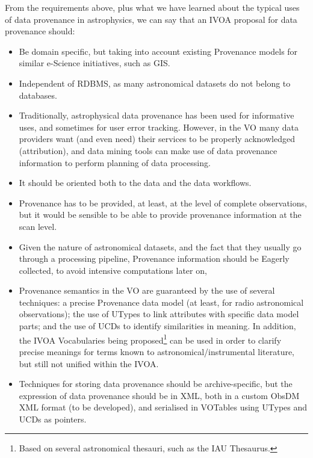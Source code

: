 		From the requirements above, plus what we have learned
		about the typical uses of data provenance in astrophysics,
		we can say that an IVOA proposal for data provenance should:
		
		\begin{itemize}
			\item Be domain specific, but taking into account
			existing Provenance models for similar e-Science
			initiatives, such as GIS.
			
			\item Independent of RDBMS, as many astronomical
			datasets do not belong to databases.
			
			\item Traditionally, astrophysical data provenance
			has been used  for informative uses, and sometimes
			for user error tracking. However, in the VO many
			data providers want (and even need) their services to
			be properly acknowledged (attribution), and data mining
			tools can make use of data provenance information to
			perform planning of data processing.
			
			\item It should be oriented both to the data and
			the data workflows.
			
			\item Provenance has to be provided, at least, at the
			level of complete observations, but it would be
			sensible to be able to provide provenance information
			at the scan level.
			
			\item Given the nature of astronomical datasets, and
			the fact that they usually go through a processing
			pipeline, Provenance information should be Eagerly
			collected, to avoid intensive computations later on,
			
			\item Provenance semantics in the VO are guaranteed by
			the use of several techniques: a precise Provenance
			data model (at least, for radio astronomical
			observations); the use of UTypes to link attributes
			with specific data model parts; and the use of UCDs to
			identify similarities in meaning. In addition, the IVOA
			Vocabularies being proposed\footnote{Based on several
			astronomical thesauri, such as the IAU Thesaurus.} can
			be used in order to clarify precise meanings for terms
			known to astronomical/instrumental literature, but
			still not unified within the IVOA.
			
			\item Techniques for storing data provenance should
			be archive-specific, but the expression of data
			provenance should be in XML, both in a custom ObsDM
			XML format (to be developed), and serialised in
			VOTables using UTypes and UCDs as pointers.
			

\end{itemize}
